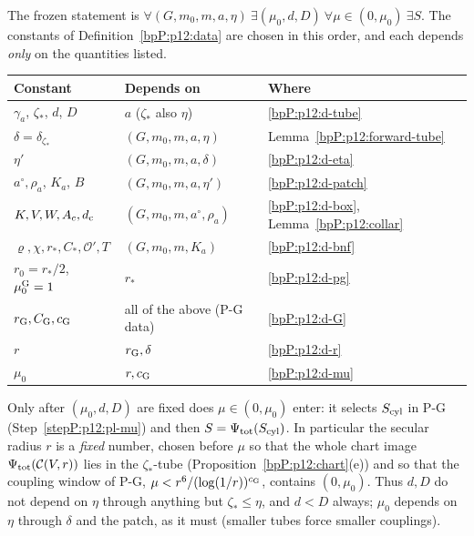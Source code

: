 \begin{remark}\label{bpP:p12:quantifiers}
The frozen statement is $\forall(G,m_0,m,a,\eta)\ \exists(\mu_0,d,D)\ \forall\mu\in(0,\mu_0)\ \exists S$. The constants of Definition~\ref{bpP:p12:data} are chosen in this order, and each depends \emph{only} on the quantities listed.
\begin{center}
\small
\begin{tabular}{@{}lll@{}}
\hline
Constant & Depends on & Where\\
\hline
$\gamma_a$, $\zeta_*$, $d$, $D$ & $a$ ($\zeta_*$ also $\eta$) & \ref{bpP:p12:d-tube}\\
$\delta=\delta_{\zeta_*}$ & $(G,m_0,m,a,\eta)$ & Lemma~\ref{bpP:p12:forward-tube}\\
$\eta'$ & $(G,m_0,m,a,\delta)$ & \ref{bpP:p12:d-eta}\\
$a^\circ,\rho_a$, $K_a$, $B$ & $(G,m_0,m,a,\eta')$ & \ref{bpP:p12:d-patch}\\
$K,V,W,A_c,d_{\rm c}$ & $(G,m_0,m,a^\circ,\rho_a)$ & \ref{bpP:p12:d-box}, Lemma~\ref{bpP:p12:collar}\\
$\varrho,\chi,r_*,C_*,\mathcal O',T$ & $(G,m_0,m,K_a)$ & \ref{bpP:p12:d-bnf}\\
$r_0=r_*/2$, $\mu_0^{\rm G}=1$ & $r_*$ & \ref{bpP:p12:d-pg}\\
$r_{\rm G},C_{\rm G},c_{\rm G}$ & all of the above (P-G data) & \ref{bpP:p12:d-G}\\
$r$ & $r_{\rm G},\delta$ & \ref{bpP:p12:d-r}\\
$\mu_0$ & $r,c_{\rm G}$ & \ref{bpP:p12:d-mu}\\
\hline
\end{tabular}
\end{center}
Only after $(\mu_0,d,D)$ are fixed does $\mu\in(0,\mu_0)$ enter: it selects $S_{\rm cyl}$ in P-G (Step~\ref{stepP:p12:pl-mu}) and then $S=\Psi_{\rm tot}(S_{\rm cyl})$. In particular the secular radius $r$ is a \emph{fixed} number, chosen before $\mu$ so that the whole chart image $\Psi_{\rm tot}(\mathcal C(V,r))$ lies in the $\zeta_*$-tube (Proposition~\ref{bpP:p12:chart}(e)) and so that the coupling window of P-G, $\mu<r^6/(\log(1/r))^{c_{\rm G}}$, contains $(0,\mu_0)$. Thus $d,D$ do not depend on $\eta$ through anything but $\zeta_*\le\eta$, and $d<D$ always; $\mu_0$ depends on $\eta$ through $\delta$ and the patch, as it must (smaller tubes force smaller couplings).
\end{remark}

